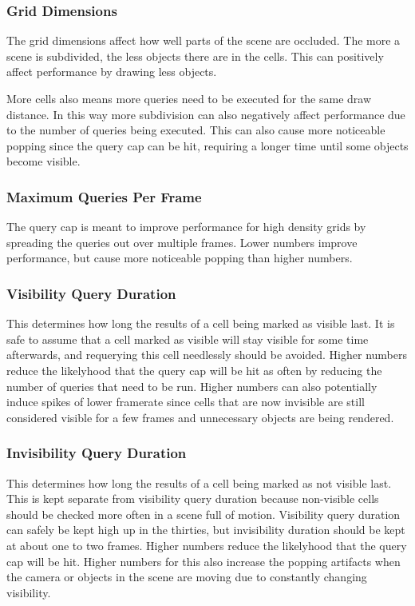 \documentclass[12pt]{ucthesis}
\begin{document}
\subsubsection{Grid Dimensions}
\label{grid-dimensions}
The grid dimensions affect how well parts of the scene are occluded.
The more a scene is subdivided, the less objects there are in the cells.
This can positively affect performance by drawing less objects.

More cells also means more queries need to be executed for the same draw distance.
In this way more subdivision can also negatively affect performance due to the number of queries being executed.
This can also cause more noticeable popping since the query cap can be hit, requiring a longer time until some objects become visible.

\subsubsection{Maximum Queries Per Frame}
\label{maximum-queries-per-frame}
The query cap is meant to improve performance for high density grids by spreading the queries out over multiple frames.
Lower numbers improve performance, but cause more noticeable popping than higher numbers.

\subsubsection{Visibility Query Duration}
\label{visibility-query-duration}
This determines how long the results of a cell being marked as visible last.
It is safe to assume that a cell marked as visible will stay visible for some time afterwards, and requerying this cell needlessly should be avoided.
Higher numbers reduce the likelyhood that the query cap will be hit as often by reducing the number of queries that need to be run.
Higher numbers can also potentially induce spikes of lower framerate since cells that are now invisible are still considered visible for a few frames and unnecessary objects are being rendered.

\subsubsection{Invisibility Query Duration}
\label{invisibility-query-duration}
This determines how long the results of a cell being marked as not visible last.
This is kept separate from visibility query duration because non-visible cells should be checked more often in a scene full of motion.
Visibility query duration can safely be kept high up in the thirties, but invisibility duration should be kept at about one to two frames.
Higher numbers reduce the likelyhood that the query cap will be hit.
Higher numbers for this also increase the popping artifacts when the camera or objects in the scene are moving due to constantly changing visibility.
\end{document}
